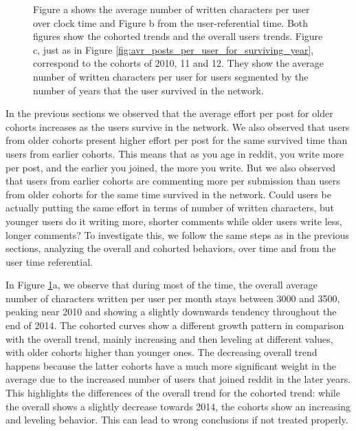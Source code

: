 \begin{figure}[!tb]
\begin{subfigure}{1\textwidth}
\caption{}\end{subfigure}
\caption{Figure a shows the average number of written characters per user over clock time and Figure b from the user-referential time. Both figures show the cohorted trends and the overall users trends. Figure c, just as in Figure \ref{fig:avr_posts_per_user_for_surviving_year}, correspond to the cohorts of 2010, 11 and 12. They show the average number of written characters per user for users segmented by the number of years that the user survived in the network.}
\label{fig:chars_users}
\end{figure}

In the previous sections we observed that the average effort per post for older cohorts increases as the users survive in the network. We also observed that users from older cohorts present higher effort per post for the same survived time than users from earlier cohorts. This means that as you age in reddit, you write more per post, and the earlier you joined, the more you write. But we also observed that users from earlier cohorts are commenting more per submission than users from older cohorts for the same time survived in the network. Could users be actually putting the same effort in terms of number of written characters, but younger users do it writing more, shorter comments while older users write less, longer comments? To investigate this, we follow the same steps as in the previous sections, analyzing the overall and cohorted behaviors, over time and from the user time referential.

In Figure \ref{fig:chars_users}a, we observe that during most of the time, the overall average number of characters written per user per month stays between 3000 and 3500, peaking near 2010 and showing a slightly downwards tendency throughout the end of 2014. The cohorted curves show a different growth pattern in comparison with the overall trend, mainly increasing and then leveling at different values, with older cohorts higher than younger ones. The decreasing overall trend happens because the latter cohorts have a much more significant weight in the average due to the increased number of users that joined reddit in the later years. This highlights the differences of the overall trend for the cohorted trend: while the overall shows a slightly decrease towards 2014, the cohorts show an increasing and leveling behavior. This can lead to wrong conclusions if not treated properly.

